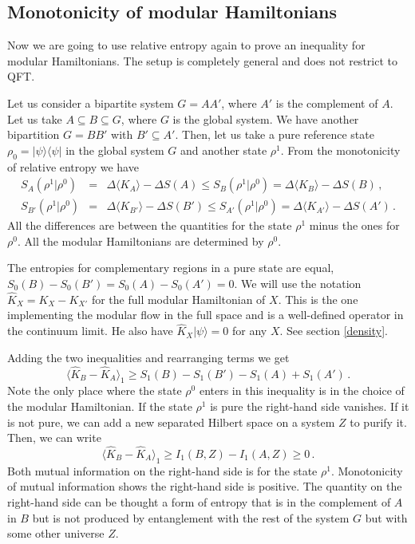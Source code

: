 \documentclass[11pt]{article}
\numberwithin{equation}{section}
\newcommand\eea{\end{eqnarray}}
\newcommand\bea{\begin{eqnarray}}
\newcommand{\be}{\begin{equation}}
\newcommand{\ee}{\end{equation}}
\begin{document}
\subsection{Monotonicity of modular Hamiltonians}

Now we are going to use relative entropy again to prove an inequality for modular Hamiltonians. The setup is completely general and does not restrict to QFT.

Let us consider a bipartite system $G=AA'$, where $A'$ is the complement of $A$. Let us take $A\subseteq B\subseteq G$, where $G$ is the global system. We have another bipartition $G=BB'$ with $B'\subseteq A'$.  Then, let us take a pure reference state $\rho_0=|\psi\rangle\langle \psi|$ in the global system $G$ and another state $\rho^1$.  
From the monotonicity of relative entropy we have
\bea
S_A(\rho^1|\rho^0) &=& \Delta \langle K_A\rangle -\Delta S(A)\le  S_B(\rho^1|\rho^0)= \Delta \langle K_B\rangle -\Delta S(B)\,,\\
S_{B'}(\rho^1|\rho^0) &=& \Delta \langle K_{B'}\rangle -\Delta S(B')\le  S_{A'}(\rho^1|\rho^0)= \Delta \langle K_{A'}\rangle -\Delta S(A')\,.
\eea
All the differences are between the quantities for the state $\rho^1$ minus the ones for $\rho^0$. All the modular Hamiltonians are determined by $\rho^0$. 

The entropies for complementary regions in a pure state are equal, $S_0(B)- S_0(B')=S_0(A)- S_0(A')=0$. We will use the notation $\hat{K}_X=K_X-K_{X'}$ for the full modular Hamiltonian of $X$. This is the one implementing the modular flow in the full space and is a well-defined operator in the continuum limit. He also have $\hat{K}_X |\psi\rangle=0$ for any $X$. See section \ref{density}. 
 
Adding the two inequalities and rearranging terms we get
\be
\langle \hat{K}_B-\hat{K}_A\rangle_1 \ge  S_1(B)- S_1(B')- S_1(A)+ S_1(A')\,.\label{pos1}
\ee
Note the only place where the state $\rho^0$ enters in this inequality is in the choice of the modular Hamiltonian. If the state $\rho^1$ is pure the right-hand side vanishes. If it is not pure, we can add a new separated Hilbert space on a system $Z$ to purify it. Then, we can write 
\be
\langle \hat{K}_B-\hat{K}_A\rangle_1 \ge  I_1(B,Z)-I_1(A,Z)\ge 0\,.\label{pos}
\ee
Both mutual information on the right-hand side is for the state $\rho^1$. Monotonicity of mutual information shows the right-hand side is positive. The quantity on the right-hand side can be thought a form of entropy that is in the complement of $A$ in $B$ but is not produced by entanglement with the rest of the system $G$ but with some other universe $Z$.  
\end{document}
